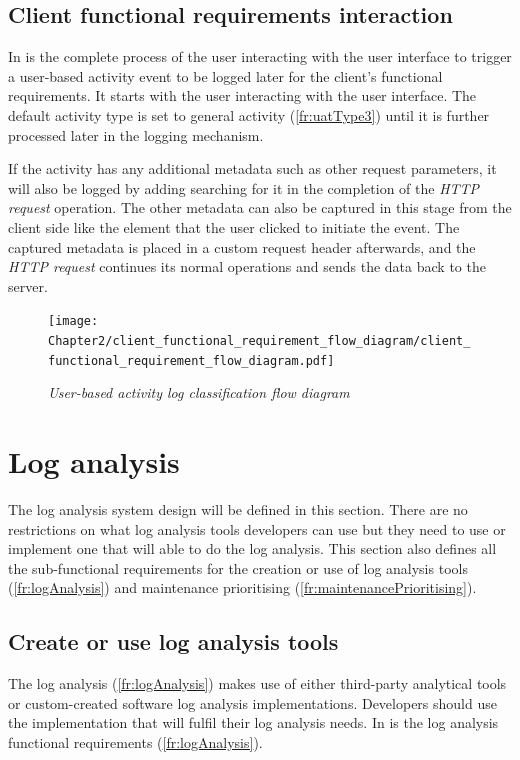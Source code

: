 \subsection{Client functional requirements interaction}
\par In  is the complete process of the user interacting with the user interface to trigger a user-based activity event to be logged later for the client's functional requirements. It starts with the user interacting with the user interface. The default activity type is set to general activity (\ref{fr:uatType3}) until it is further processed later in the logging mechanism.\par If the activity has any additional metadata such as other request parameters, it will also be logged by adding searching for it in the completion of the \textit{HTTP request} operation. The other metadata can also be captured in this stage from the client side like the element that the user clicked to initiate the event. The captured metadata is placed in a custom request header afterwards, and the \textit{HTTP request} continues its normal operations and sends the data back to the server.

\begin{figure}[!htb] %
	\centering %
	\texttt{[image: Chapter2/client\_functional\_requirement\_flow\_diagram/client\_functional\_requirement\_flow\_diagram.pdf]}
	\caption[User-based activity log classification flow diagram]
	{\textit{User-based activity log classification flow diagram}}\label{fig:ch2_user_based_actvity_classification}
\end{figure}

\clearpage

\section{Log analysis}\label{ch2:sec_system_utilisation_analysis}
The log analysis system design will be defined in this section. There are no restrictions on what log analysis tools developers can use but they need to use or implement one that will able to do the log analysis. This section also defines all the sub-functional requirements for the creation or use of log analysis tools (\ref{fr:logAnalysis}) and maintenance prioritising (\ref{fr:maintenancePrioritising}).

\subsection{Create or use log analysis tools}\label{sec:ch2_logAnalysisTools}
The log analysis (\ref{fr:logAnalysis}) makes use of either third-party analytical tools or custom-created software log analysis implementations. Developers should use the implementation that will fulfil their log analysis needs. In  is the log analysis functional requirements (\ref{fr:logAnalysis}).


